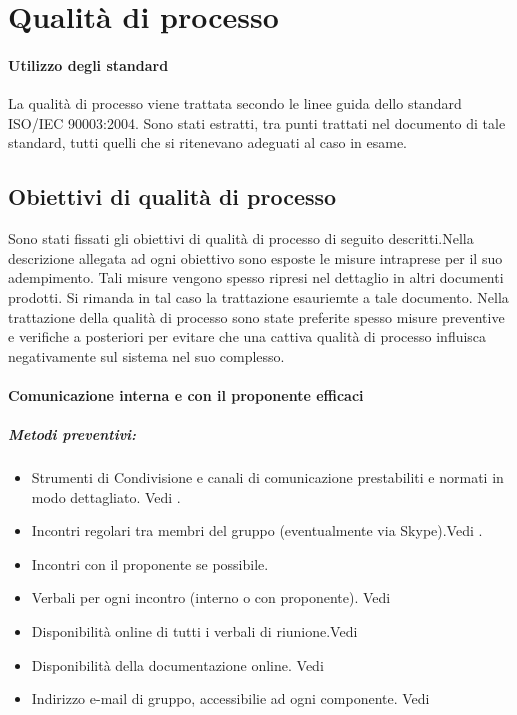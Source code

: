 \documentclass[12pt,a4paper]{article}
\begin{document}
\section{Qualità di processo}
\paragraph{Utilizzo degli standard}
La qualità di processo viene trattata secondo le linee guida dello standard ISO/IEC 90003:2004. Sono stati estratti, tra punti trattati nel documento di tale standard, tutti quelli che si ritenevano adeguati al caso in esame.
\subsection{Obiettivi di qualità di processo}
Sono stati fissati gli obiettivi di qualità di processo di seguito descritti.Nella descrizione allegata ad ogni obiettivo sono esposte le misure intraprese per il suo adempimento. Tali misure vengono spesso ripresi nel dettaglio in altri documenti prodotti. Si rimanda in tal caso la trattazione esauriemte a tale documento. 
Nella trattazione della qualità di processo sono state preferite spesso misure preventive e verifiche a posteriori per evitare che una cattiva qualità di processo influisca negativamente sul sistema nel suo complesso.

\paragraph{Comunicazione interna e con il proponente efficaci}
\subparagraph{Metodi preventivi:}
\begin{itemize}
	\item Strumenti di Condivisione e canali di comunicazione prestabiliti e normati in modo dettagliato. Vedi \NdP{}.
	\item Incontri regolari tra membri del gruppo (eventualmente via Skype).Vedi \NdP{}.
	\item Incontri con il proponente se possibile.
	\item Verbali per ogni incontro (interno o con proponente). Vedi \NdP{}
	\item Disponibilità online di tutti i verbali di riunione.Vedi \NdP{}
	\item Disponibilità della documentazione online. Vedi \NdP
	\item Indirizzo e-mail di gruppo, accessibilie ad ogni componente. Vedi \NdP{}
\end{itemize}
\end{document}
